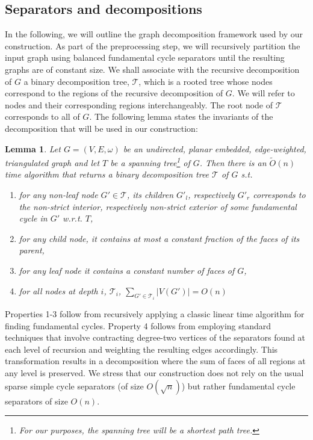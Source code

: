 \documentclass[a4paper,UKenglish,cleveref, autoref, thm-restate]{article}
\newtheorem{lemma}{Lemma}
\begin{document}
\subsection{Separators and decompositions}
In the following, we will outline the graph decomposition framework used by our construction. As part of the preprocessing step, we will recursively partition the input graph using balanced fundamental cycle separators until the resulting graphs are of constant size. We shall associate with the recursive decomposition of $G$ a binary decomposition tree, $\mathcal{T}$, which is a rooted tree whose nodes correspond to the regions of the recursive decomposition of $G$. We will refer to nodes and their corresponding regions interchangeably. The root node of $\mathcal{T}$ corresponds to all of $G$. The following lemma states the invariants of the decomposition that will be used in our construction:

\begin{lemma}\label{lem:decomp-tree}
Let $G=(V,E,\omega)$ be an undirected, planar embedded, edge-weighted, triangulated graph and let $T$ be a spanning tree\footnote{For our purposes, the spanning tree will be a shortest path tree.} of $G$. Then there is an $\tilde{O}(n)$ time algorithm that returns a \textit{binary decomposition tree} $\mathcal{T}$ of $G$ s.t.
\begin{enumerate}
\item for any non-leaf node $G' \in \mathcal{T}$, its children $G'_l$, respectively $G'_r$ corresponds to the non-strict interior, respectively non-strict exterior of some fundamental cycle in $G'$ w.r.t. $T$,
\item for any child node, it contains at most a constant fraction of the faces of its parent,
\item for any leaf node it contains a constant number of faces of $G$,
\item for all nodes at depth $i$, $\mathcal{T}_i$, $\sum_{G' \in \mathcal{T}_i} |V(G')| = O(n)$
\end{enumerate}
\end{lemma}

Properties 1-3 follow from recursively applying a classic linear time algorithm for finding fundamental cycles. Property 4 follows from employing standard techniques that involve contracting degree-two vertices of the separators found at each level of recursion and weighting the resulting edges accordingly. This transformation results in a decomposition where the sum of faces of all regions at any level is preserved. We stress that our construction does not rely on the usual sparse simple cycle separators (of size $O(\sqrt{n})$) but rather fundamental cycle separators of size $O(n)$.
\end{document}
